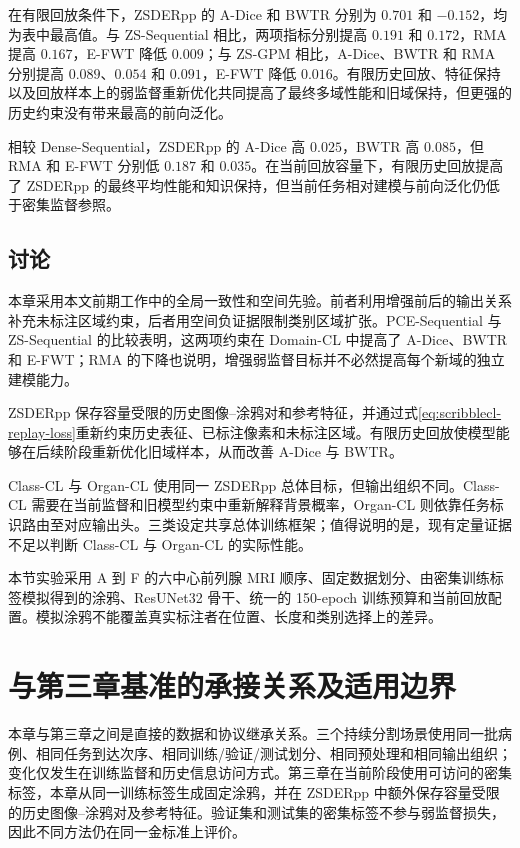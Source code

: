 在有限回放条件下，ZSDERpp 的 A-Dice 和 BWTR 分别为 $0.701$ 和 $-0.152$，均为表中最高值。与 ZS-Sequential 相比，两项指标分别提高 $0.191$ 和 $0.172$，RMA 提高 $0.167$，E-FWT 降低 $0.009$；与 ZS-GPM 相比，A-Dice、BWTR 和 RMA 分别提高 $0.089$、$0.054$ 和 $0.091$，E-FWT 降低 $0.016$。有限历史回放、特征保持以及回放样本上的弱监督重新优化共同提高了最终多域性能和旧域保持，但更强的历史约束没有带来最高的前向泛化。

相较 Dense-Sequential，ZSDERpp 的 A-Dice 高 $0.025$，BWTR 高 $0.085$，但 RMA 和 E-FWT 分别低 $0.187$ 和 $0.035$。在当前回放容量下，有限历史回放提高了 ZSDERpp 的最终平均性能和知识保持，但当前任务相对建模与前向泛化仍低于密集监督参照。

\subsection{讨论}
\label{subsec:scribblecl-discussion}

本章采用本文前期工作中的全局一致性和空间先验\cite{zhang2026zscribbleseg}。前者利用增强前后的输出关系补充未标注区域约束，后者用空间负证据限制类别区域扩张。PCE-Sequential 与 ZS-Sequential 的比较表明，这两项约束在 Domain-CL 中提高了 A-Dice、BWTR 和 E-FWT；RMA 的下降也说明，增强弱监督目标并不必然提高每个新域的独立建模能力。

ZSDERpp 保存容量受限的历史图像--涂鸦对和参考特征，并通过式\eqref{eq:scribblecl-replay-loss}重新约束历史表征、已标注像素和未标注区域。有限历史回放使模型能够在后续阶段重新优化旧域样本，从而改善 A-Dice 与 BWTR。

Class-CL 与 Organ-CL 使用同一 ZSDERpp 总体目标，但输出组织不同。Class-CL 需要在当前监督和旧模型约束中重新解释背景概率，Organ-CL 则依靠任务标识路由至对应输出头。三类设定共享总体训练框架；值得说明的是，现有定量证据不足以判断 Class-CL 与 Organ-CL 的实际性能。

本节实验采用 A 到 F 的六中心前列腺 MRI 顺序、固定数据划分、由密集训练标签模拟得到的涂鸦、ResUNet32 骨干、统一的 150-epoch 训练预算和当前回放配置。模拟涂鸦不能覆盖真实标注者在位置、长度和类别选择上的差异。

\section{与第三章基准的承接关系及适用边界}
\label{sec:scribblecl-benchmark-connection}

本章与第三章之间是直接的数据和协议继承关系。三个持续分割场景使用同一批病例、相同任务到达次序、相同训练/验证/测试划分、相同预处理和相同输出组织；变化仅发生在训练监督和历史信息访问方式。第三章在当前阶段使用可访问的密集标签，本章从同一训练标签生成固定涂鸦，并在 ZSDERpp 中额外保存容量受限的历史图像--涂鸦对及参考特征。验证集和测试集的密集标签不参与弱监督损失，因此不同方法仍在同一金标准上评价。

